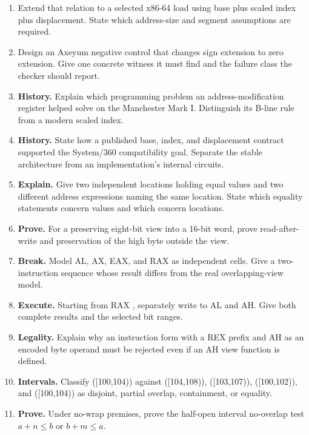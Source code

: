 \begin{enumerate}
\item Extend that relation to a selected x86-64 load using base plus scaled
index plus displacement. State which address-size and segment assumptions are
required.

\item Design an Axeyum negative control that changes sign extension to zero
extension. Give one concrete witness it must find and the failure class the
checker should report.

\item \textbf{History.} Explain which programming problem an address-modification
register helped solve on the Manchester Mark I. Distinguish its B-line rule
from a modern scaled index.

\item \textbf{History.} State how a published base, index, and displacement
contract supported the System/360 compatibility goal. Separate the stable
architecture from an implementation's internal circuits.

\item \textbf{Explain.} Give two independent locations holding equal values
and two different address expressions naming the same location. State which
equality statements concern values and which concern locations.

\item \textbf{Prove.} For a preserving eight-bit view into a 16-bit word,
prove read-after-write and preservation of the high byte outside the view.

\item \textbf{Break.} Model AL, AX, EAX, and RAX as independent cells. Give a
two-instruction sequence whose result differs from the real overlapping-view
model.

\item \textbf{Execute.} Starting from RAX , separately
write  to AL and AH. Give both complete results and the selected bit
ranges.

\item \textbf{Legality.} Explain why an instruction form with a REX prefix and
AH as an encoded byte operand must be rejected even if an AH view function is
defined.

\item \textbf{Intervals.} Classify ([100,104)) against ([104,108)),
([103,107)), ([100,102)), and ([100,104)) as disjoint, partial overlap,
containment, or equality.

\item \textbf{Prove.} Under no-wrap premises, prove the half-open interval
no-overlap test \(a+n\leq b\) or \(b+m\leq a\).


\end{enumerate}
